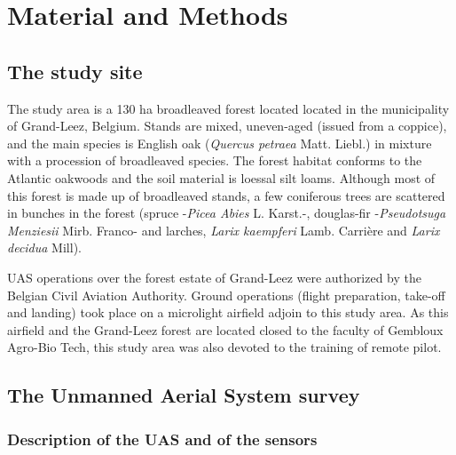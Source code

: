 \documentclass[remotesensing,article,submit,moreauthors,pdftex,12pt,a4paper]{mdpi} %
\begin{document}
\section{Material and Methods}

\subsection{The study site}

The study area is a 130 ha broadleaved forest located located in the municipality of Grand-Leez, Belgium. 
Stands are mixed, uneven-aged (issued from a coppice), and the main species is English oak (\textit{Quercus petraea} Matt. Liebl.) in mixture with a procession of broadleaved species. 
The forest habitat conforms to the Atlantic oakwoods and the soil material is loessal silt loams. 
Although most of this forest is made up of broadleaved stands, a few coniferous trees are scattered in bunches in the forest (spruce -\textit{Picea Abies} L. Karst.-, douglas-fir -\textit{Pseudotsuga Menziesii} Mirb. Franco- and larches, \textit{Larix kaempferi} Lamb. Carrière and \textit{Larix decidua} Mill).

UAS operations over the forest estate of Grand-Leez were authorized by the Belgian Civil Aviation Authority. 
Ground operations (flight preparation, take-off and landing) took place on a microlight airfield adjoin to this study area. 
As this airfield and the Grand-Leez forest are located closed to the faculty of Gembloux Agro-Bio Tech, this study area was also devoted to the training of remote pilot. 



\subsection{The Unmanned Aerial System survey}

\subsubsection{Description of the UAS and of the sensors}
\end{document}
